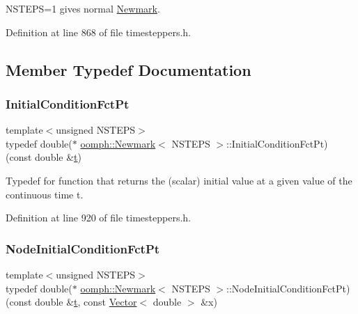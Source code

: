 N\+S\+T\+E\+PS=1 gives normal \hyperlink{classoomph_1_1Newmark}{Newmark}. 

Definition at line 868 of file timesteppers.\+h.



\subsection{Member Typedef Documentation}
\mbox{\label{classoomph_1_1Newmark_a40793f69efc56441a46296ad428dc3d4}} 
\subsubsection{\texorpdfstring{Initial\+Condition\+Fct\+Pt}{InitialConditionFctPt}}
{\footnotesize\ttfamily template$<$unsigned N\+S\+T\+E\+PS$>$ \\
typedef double($\ast$ \hyperlink{classoomph_1_1Newmark}{oomph\+::\+Newmark}$<$ N\+S\+T\+E\+PS $>$\+::Initial\+Condition\+Fct\+Pt) (const double \&\hyperlink{cfortran_8h_af6f0bd3dc13317f895c91323c25c2b8f}{t})}



Typedef for function that returns the (scalar) initial value at a given value of the continuous time t. 



Definition at line 920 of file timesteppers.\+h.

\mbox{\label{classoomph_1_1Newmark_af7c5c0d8127484525f751f084aa36d67}} 
\subsubsection{\texorpdfstring{Node\+Initial\+Condition\+Fct\+Pt}{NodeInitialConditionFctPt}}
{\footnotesize\ttfamily template$<$unsigned N\+S\+T\+E\+PS$>$ \\
typedef double($\ast$ \hyperlink{classoomph_1_1Newmark}{oomph\+::\+Newmark}$<$ N\+S\+T\+E\+PS $>$\+::Node\+Initial\+Condition\+Fct\+Pt) (const double \&\hyperlink{cfortran_8h_af6f0bd3dc13317f895c91323c25c2b8f}{t}, const \hyperlink{classoomph_1_1Vector}{Vector}$<$ double $>$ \&x)}



